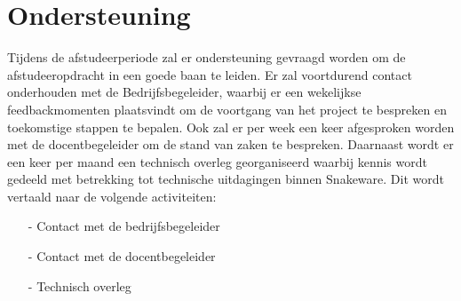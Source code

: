 \section{Ondersteuning}
Tijdens de afstudeerperiode zal er ondersteuning gevraagd worden om de afstudeeropdracht in een goede baan te leiden.
Er zal voortdurend contact onderhouden met de Bedrijfsbegeleider, waarbij er een wekelijkse feedbackmomenten plaatsvindt om de voortgang van het project te bespreken en toekomstige stappen te bepalen.
Ook zal er per week een keer afgesproken worden met de docentbegeleider om de stand van zaken te bespreken.
Daarnaast wordt er een keer per maand een technisch overleg georganiseerd waarbij kennis wordt gedeeld met betrekking tot technische uitdagingen binnen Snakeware.
Dit wordt vertaald naar de volgende activiteiten:

\whitespace
\begin{itemize}
	\item[-] Contact met de bedrijfsbegeleider
	\item[-] Contact met de docentbegeleider
	\item[-] Technisch overleg
\end{itemize}
